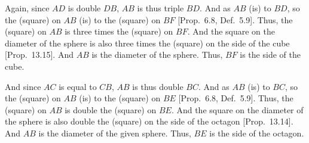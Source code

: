 \begin{Parallel}{}{}
{Again, since $AD$ is double $DB$,  $AB$ is thus triple $BD$. And
as $AB$ (is) to $BD$, so the (square) on $AB$ (is) to the (square)
on $BF$ [Prop.~6.8, Def.~5.9]. Thus, the (square) on $AB$
is three times the (square) on $BF$.  And the square on the diameter of
the sphere is also three times the (square) on the side of the cube [Prop.~13.15]. And $AB$ is the diameter of the sphere. Thus, $BF$ is the
side of the cube.

And since $AC$ is equal to $CB$, $AB$ is thus double $BC$.  And
as $AB$ (is) to $BC$, so the (square) on $AB$ (is) to the (square)
on $BE$ [Prop.~6.8, Def.~5.9]. Thus, the (square) on $AB$
is double the (square) on $BE$. And the square on the diameter
of the sphere is also double the (square) on the side of the octagon [Prop.~13.14]. And $AB$ is the diameter of the given sphere. Thus,
$BE$ is the side of the octagon.

}
\end{Parallel}
